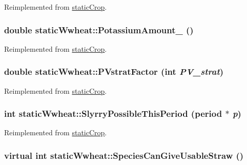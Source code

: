 Reimplemented from \hyperlink{classstatic_crop_abaa5c59d4074d47dedc79172f8326e08}{staticCrop}.\hypertarget{classstatic_wwheat_ac3e69e6aea659a75d0db30841c82ca6d}{
\subsubsection[{PotassiumAmount\_\-}]{\setlength{\rightskip}{0pt plus 5cm}double staticWwheat::PotassiumAmount\_\- ()}}
\label{classstatic_wwheat_ac3e69e6aea659a75d0db30841c82ca6d}


Reimplemented from \hyperlink{classstatic_crop_a41fee98d728c7670e6acb504a9b3459d}{staticCrop}.\hypertarget{classstatic_wwheat_ab8772fd418b602cc729945fdaebf695e}{
\subsubsection[{PVstratFactor}]{\setlength{\rightskip}{0pt plus 5cm}double staticWwheat::PVstratFactor (int {\em PV\_\-strat})}}
\label{classstatic_wwheat_ab8772fd418b602cc729945fdaebf695e}


Reimplemented from \hyperlink{classstatic_crop_ae4f07498c1616eab212386faf352d348}{staticCrop}.\hypertarget{classstatic_wwheat_a9c50241cdc2ca7f9bf8a05813415eb3e}{
\subsubsection[{SlyrryPossibleThisPeriod}]{\setlength{\rightskip}{0pt plus 5cm}int staticWwheat::SlyrryPossibleThisPeriod ({\bf period} $\ast$ {\em p})}}
\label{classstatic_wwheat_a9c50241cdc2ca7f9bf8a05813415eb3e}


Reimplemented from \hyperlink{classstatic_crop_ada7c8c797de629277a5ba0b0a4a3c17e}{staticCrop}.\hypertarget{classstatic_wwheat_a51961674d4896c3f4c69bec9a4e47ee0}{
\subsubsection[{SpeciesCanGiveUsableStraw}]{\setlength{\rightskip}{0pt plus 5cm}virtual int staticWwheat::SpeciesCanGiveUsableStraw ()}}
\label{classstatic_wwheat_a51961674d4896c3f4c69bec9a4e47ee0}


